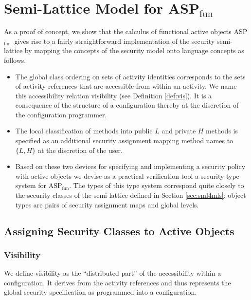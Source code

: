 \documentclass[10pt, conference, compsocconf]{IEEEtran}
\newcommand\aspfun{ASP${}_\text{fun}$\ }
\newcommand\aspfunp{ASP${}_\text{fun}$}
\begin{document}
{\section{Semi-Lattice Model for \aspfun}
\label{sec:smlasp}
As a proof of concept, we show that the calculus of functional active objects
\aspfun gives rise to a fairly straightforward implementation of the security semi-lattice
by mapping the concepts of the security model onto language concepts as follows.
\begin{itemize}
\item The global class ordering on sets of activity identities corresponds to the
      sets of activity references that are accessible from within an activity. We name this
      accessibility relation visibility (see Definition \ref{def:vis}). It is a consequence
      of the structure of a configuration thereby at the discretion of the configuration programmer.
\item The local classification of methods into public $L$ and private $H$ methods is specified
      as an additional security assignment mapping method names to $\{L,H\}$ at the discretion of the
      user.
\item Based on these two devices for specifying and implementing a security policy with active objects
      we devise as a practical verification tool a security type system for \aspfunp. The types of this
      type system correspond quite closely to the security classes of the semi-lattice defined in Section
      \ref{sec:sml4mls}: object types are pairs of security assignment maps and global levels.
\end{itemize}


\subsection{Assigning Security Classes to Active Objects}

\subsubsection*{Visibility}
We define visibility as the ``distributed part'' of the accessibility 
within a configuration. It derives from the activity references and
thus represents the global security specification as programmed into 
a configuration.

}
\end{document}

